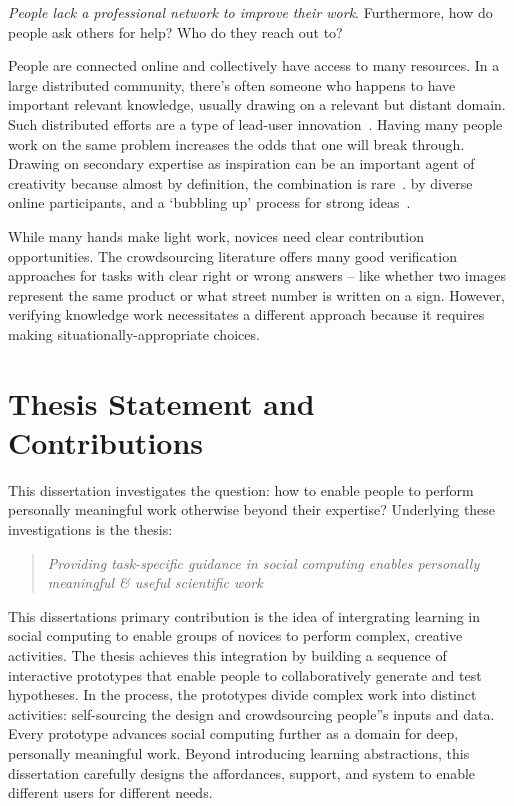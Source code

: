 

\textit{People lack a professional network to improve their work}. 
Furthermore,  how do people ask others for help? Who do they reach out to?

People are connected online and collectively have access to many resources.
In a large distributed community, there’s often someone who happens to 
have important relevant knowledge, usually drawing on a relevant but 
distant domain. Such distributed efforts are a type of lead-user innovation~\cite{VonHippel2005a}. 
Having many people work on the same problem increases the odds that 
one will break through. Drawing on secondary expertise as inspiration can
 be an important agent of creativity because almost by definition, the 
combination is rare~\cite{Boden2004}. %
by diverse online participants, and a ‘bubbling up’ process for strong ideas~\cite{Yu2012}.

While many hands make light work, novices need clear contribution opportunities. 
The crowdsourcing literature offers many good verification approaches for tasks 
with clear right or wrong answers – like whether two images represent the same 
product or what street number is written on a sign. However, verifying knowledge
 work necessitates a different approach because it requires making 
situationally-appropriate choices. 

\section{Thesis Statement and Contributions}
This dissertation investigates the question: how to enable people to perform personally meaningful work otherwise beyond their expertise? Underlying these investigations is the thesis:
\begin{quote}
\emph{Providing task-specific guidance in social computing enables personally meaningful \& useful scientific work}
\end{quote}

This dissertation\textquotesingle s primary contribution is the idea of intergrating learning in social computing to enable groups of novices to perform complex, creative activities. The thesis achieves this integration by building a sequence of interactive prototypes that enable people to collaboratively generate and test hypotheses. In the process, the prototypes divide complex work into distinct activities: self-sourcing the design and crowdsourcing people''s inputs and data. Every prototype advances social computing further as a domain for deep, personally meaningful work. Beyond introducing learning abstractions, this dissertation carefully designs the affordances, support, and system to enable different users for different needs. 

